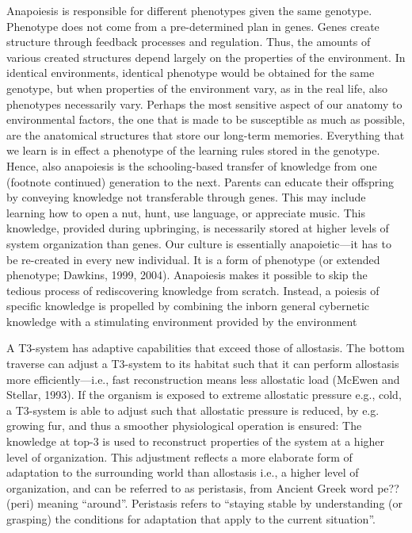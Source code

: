 \documentclass[10pt,a4paper]{article}
\begin{document}
Anapoiesis is responsible for different phenotypes given the same genotype.
Phenotype does not come from a pre-determined plan in genes. Genes create
structure through feedback processes and regulation. Thus, the amounts of various
created structures depend largely on the properties of the environment. In identical
environments, identical phenotype would be obtained for the same genotype, but
when properties of the environment vary, as in the real life, also phenotypes
necessarily vary. Perhaps the most sensitive aspect of our anatomy to environmental
factors, the one that is made to be susceptible as much as possible, are the
anatomical structures that store our long-term memories. Everything that we learn
is in effect a phenotype of the learning rules stored in the genotype.
Hence, also anapoiesis is the schooling-based transfer of knowledge from one
(footnote continued)
generation to the next. Parents can educate their offspring by conveying knowledge
not transferable through genes. This may include learning how to open a nut, hunt,
use language, or appreciate music. This knowledge, provided during upbringing, is
necessarily stored at higher levels of system organization than genes. Our culture is
essentially anapoietic—it has to be re-created in every new individual. It is a form of
phenotype (or extended phenotype; Dawkins, 1999, 2004). Anapoiesis makes it
possible to skip the tedious process of rediscovering knowledge from scratch.
Instead, a poiesis of specific knowledge is propelled by combining the inborn
general cybernetic knowledge with a stimulating environment provided by the
environment


A T3-system
has adaptive capabilities that exceed those of allostasis. The
bottom traverse can adjust a T3-system to its habitat such that it
can perform allostasis more efficiently—i.e., fast reconstruction
means less allostatic load (McEwen and Stellar, 1993). If the
organism is exposed to extreme allostatic pressure e.g., cold, a
T3-system is able to adjust such that allostatic pressure is reduced,
by e.g. growing fur, and thus a smoother physiological operation is
ensured: The knowledge at top-3 is used to reconstruct properties
of the system at a higher level of organization. This adjustment
reflects a more elaborate form of adaptation to the surrounding
world than allostasis i.e., a higher level of organization, and can be
referred to as peristasis, from Ancient Greek word pe?? (peri)
meaning “around”. Peristasis refers to “staying stable by understanding
(or grasping) the conditions for adaptation that apply to
the current situation”. 
\end{document}
